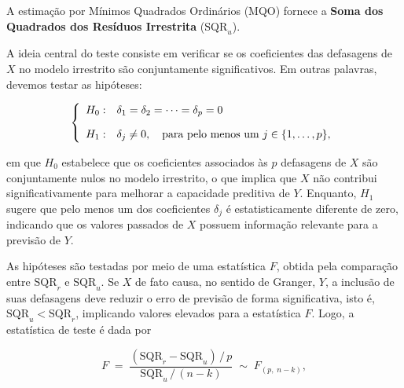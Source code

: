 A estimação por Mínimos Quadrados Ordinários (MQO) fornece a \textbf{Soma dos Quadrados dos Resíduos Irrestrita} ($\mathrm{SQR}_u$). 

A ideia central do teste consiste em verificar se os coeficientes das defasagens de $X$ no modelo irrestrito são conjuntamente significativos. Em outras palavras, devemos testar as hipóteses:

\begin{equation}
\left\{
\begin{array}{ll}
H_0: & \delta_1 = \delta_2 = \cdots = \delta_p = 0 \\[10pt]
H_1: & \delta_j \neq 0, \quad \textnormal{para pelo menos um } j \in \{1, \ldots, p\},
\end{array}
\right.
\label{eq:hipoteses}
\end{equation}

\noindent em que $H_0$ estabelece que os coeficientes associados às $p$ defasagens de $X$ são conjuntamente nulos no modelo irrestrito, o que implica que $X$ não contribui significativamente para melhorar a capacidade preditiva de $Y$. Enquanto, $H_1$ sugere que pelo menos um dos coeficientes $\delta_j$ é estatisticamente diferente de zero, indicando que os valores passados de $X$ possuem informação relevante para a previsão de $Y$.


As hipóteses são testadas por meio de uma estatística $F$, obtida pela comparação entre $\mathrm{SQR}_r$ e $\mathrm{SQR}_u$. Se  $X$ de fato causa, no sentido de Granger, $Y$, a inclusão de suas defasagens deve reduzir o erro de previsão de forma significativa, isto é, $\mathrm{SQR}_u < \mathrm{SQR}_r$, implicando valores elevados para a estatística $F$. Logo, a estatística de teste é dada por

\begin{equation}
    F \;=\; \frac{(\mathrm{SQR}_r - \mathrm{SQR}_u)\,/\,p}{\mathrm{SQR}_u\,/\,(n - k)} \;\sim\; F_{(p,\; n-k)},
    \label{eq:estatistica_F}
\end{equation}

